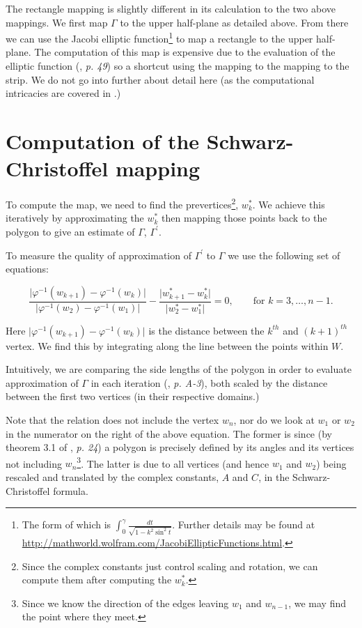 \documentclass[a4paper,10pt]{amsart}
\newcommand{\sch}{Schwarz-Christoffel }
\newcommand{\phiinv}{\phi^{-1}}
\renewcommand{\phi}{\varphi}
\begin{document}
The rectangle mapping is slightly different in its calculation to the two above mappings. We first map $\Gamma$ to the upper half-plane as detailed above. From there we can use the Jacobi elliptic function\footnote{The form of which is $\int_0^\gamma \frac{dt}{\sqrt{1-k^2\sin^2t}}$. Further details may be found at \url{http://mathworld.wolfram.com/JacobiEllipticFunctions.html}.} to map a rectangle to the upper half-plane. The computation of this map is expensive due to the evaluation of the elliptic function (\cite{driscoll}, \emph{p. 49}) so a shortcut using the mapping to the mapping to the strip. We do not go into further about detail here (as the computational intricacies are covered in \cite{howell90}.)



\section{Computation of the \sch mapping}

To compute the map, we need to find the prevertices\footnote{Since the complex constants just control scaling and rotation, we can compute them after computing the $w^*_k$.}, $w^*_k$. We achieve this iteratively by approximating the $w^*_k$ then mapping those points back to the polygon to give an estimate of $\Gamma$, $\Gamma^\prime$. 

To measure the quality of approximation of $\Gamma^\prime$ to $\Gamma$ we use the following set of equations:

\begin{equation}
\label{optimizeme}
\frac{\vert \phiinv(w_{k+1}) -  \phiinv(w_k) \vert}{\vert \phiinv(w_2)-\phiinv(w_1)\vert} - \frac{\vert w^*_{k+1} - w^*_k\vert}{\vert w^*_2 - w^*_1\vert} = 0, \qquad \text{for } k=3,\dots,n-1.
\end{equation}

Here $\vert \phiinv(w_{k+1}) -  \phiinv(w_k) \vert$ is the distance between the $k^{th}$ and $(k+1)^{th}$ vertex.  We find this by integrating along the line between the points within $W$.

Intuitively, we are comparing the side lengths of the polygon in order to evaluate approximation of $\Gamma$ in each iteration (\cite{snider}, \emph{p. A-3}), both scaled by the distance between the first two vertices (in their respective domains.)

Note that the relation does not include the vertex $w_n$, nor do we look at $w_1$ or $w_2$ in the numerator on the right of the above equation. The former is since (by theorem 3.1 of \cite{driscoll}, \emph{p. 24}) a polygon is precisely defined by its angles and its vertices not including $w_n$\footnote{Since we know the direction of the edges leaving $w_1$ and $w_{n-1}$, we may find the point where they meet.}. The latter is due to all vertices (and hence $w_1$ and $w_2$) being rescaled and translated by the complex constants, $A$ and $C$, in the \sch formula.
\end{document}

